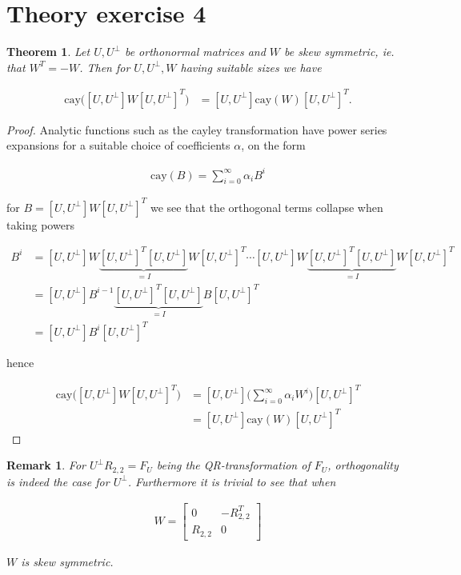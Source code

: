 \documentclass[11pt,a4paper,english]{elsarticle}%
\newtheorem{theorem}{Theorem}
\newtheorem*{remark}{Remark}
\begin{document}
\section{Theory exercise 4}

\begin{theorem}
  Let $U,U^{\perp}$ be orthonormal matrices and $W$ be skew symmetric, ie. that $W^T = -W$. Then for $U,U^{\perp},W$ having suitable sizes we have

  \begin{align*}
    \text{cay}\bigg([U,U^{\perp}]W[U,U^{\perp}]^T\bigg) &= [U,U^{\perp}]\text{cay}(W)[U,U^{\perp}]^T. 
  \end{align*}
\end{theorem}

\begin{proof}
  Analytic functions such as the cayley transformation have power series expansions for a suitable choice of coefficients $\alpha$, on the form

  \begin{align*}
    \text{cay}(B) = \sum_{i=0}^{\infty} \alpha_i B^i
  \end{align*}

  for $B = [U,U^{\perp}]W[U,U^{\perp}]^T$ we see that the orthogonal terms collapse when taking powers

  \begin{align*}
    B^i &= [U,U^{\perp}]W\underbrace{[U,U^{\perp}]^T[U,U^{\perp}]}_{= I}W[U,U^{\perp}]^T\cdots[U,U^{\perp}]W\underbrace{[U,U^{\perp}]^T[U,U^{\perp}]}_{= I}W[U,U^{\perp}]^T \\
    &= [U,U^{\perp}]B^{i-1}\underbrace{[U,U^{\perp}]^T[U,U^{\perp}]}_{= I}B[U,U^{\perp}]^T \\
    &= [U,U^{\perp}]B^i[U,U^{\perp}]^T 
  \end{align*}

\noindent hence 

\begin{align*}
  \text{cay}\bigg([U,U^{\perp}]W[U,U^{\perp}]^T\bigg) &= [U,U^{\perp}]\bigg(\sum_{i=0}^{\infty} \alpha_i W^i\bigg)[U,U^{\perp}]^T \\
  &=  [U,U^{\perp}]\text{cay}(W)[U,U^{\perp}]^T
\end{align*}

\end{proof}

\begin{remark}
  For $U^{\perp}R_{2,2} = F_U$ being the QR-transformation of $F_U$, orthogonality is indeed the case for $U^{\perp}$. Furthermore it is trivial to see that when 

  \begin{align*}
    W = \begin{bmatrix}
      0&-R^T_{2,2} \\
      R_{2,2}&0
    \end{bmatrix}
  \end{align*}

  $W$ is skew symmetric.
\end{remark}



\end{document}
